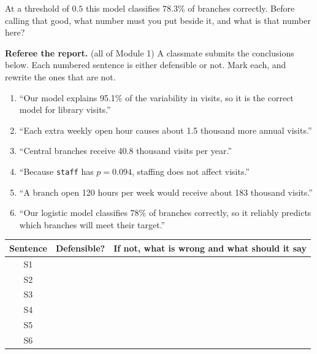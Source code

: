 \documentclass[11pt]{article}
\newcommand{\answerspace}[1]{\vspace{#1}}
\newcommand{\lo}[1]{{\normalfont\small (#1)}}
\begin{document}
\begin{questions}
\begin{parts}
\item At a threshold of $0.5$ this model classifies $78.3\%$ of branches correctly. Before calling
that good, what number must you put beside it, and what is that number here?
\answerspace{3.5em}
\end{parts}

\item \textbf{Referee the report.} \lo{all of Module 1} A classmate submits the conclusions below.
Each numbered sentence is either defensible or not. Mark each, and rewrite the ones that are not.

\begin{enumerate}[label=\textbf{S\arabic*.}, leftmargin=2.2em, itemsep=.3em, topsep=.4em]
\item ``Our model explains 95.1\% of the variability in visits, so it is the correct model for
library visits.''
\item ``Each extra weekly open hour causes about 1.5 thousand more annual visits.''
\item ``Central branches receive 40.8 thousand visits per year.''
\item ``Because \texttt{staff} has $p = 0.094$, staffing does not affect visits.''
\item ``A branch open 120 hours per week would receive about 183 thousand visits.''
\item ``Our logistic model classifies 78\% of branches correctly, so it reliably predicts which
branches will meet their target.''
\end{enumerate}

\begin{center}
\renewcommand{\arraystretch}{2.1}
\begin{tabularx}{\linewidth}{ccL}
\toprule
\textbf{Sentence} & \textbf{Defensible?} & \textbf{If not, what is wrong and what should it say} \\
\midrule
S1 & & \\
S2 & & \\
S3 & & \\
S4 & & \\
S5 & & \\
S6 & & \\
\bottomrule
\end{tabularx}
\end{center}

\end{questions}
\end{document}
